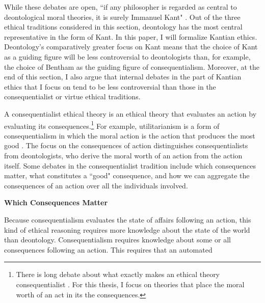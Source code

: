 \begin{isabellebody}
\begin{isamarkuptext}
While these debates are open, ``if any philosopher is regarded as central
to deontological moral theories, it is surely Immanuel Kant" \citep{sepdeont}. Out of the three ethical
traditions considered in this section, deontology has the most central representative in the form of 
Kant. In this paper, I will 
formalize Kantian ethics. Deontology's comparatively greater focus on Kant means that the choice of 
Kant as a guiding figure will be less controversial to deontologists than, for example, the choice of Bentham
as the guiding figure of consequentialism. Moreover, at the end of this section, I also argue that 
internal debates in the part of Kantian ethics that I focus on tend to be less controversial than those
in the consequentialist or virtue ethical traditions.%
\end{isamarkuptext}\isamarkuptrue%
%
\isadelimdocument
%
\endisadelimdocument
%
\isatagdocument
%
\isamarkuptrue%
%
\endisatagdocument
{\isafolddocument}%
%
\isadelimdocument
%
\endisadelimdocument
%
\begin{isamarkuptext}%
A consequentialist ethical theory is an ethical theory that evaluates an 
action by evaluating its consequences.\footnote{There is long debate about what exactly makes an ethical theory consequentialist \citep{consequentialismsep}. 
For this thesis, I focus on theories that place the moral worth of an act in its the consequences.} For example, 
utilitarianism is a form of consequentialism in which the moral action 
is the action that produces the most good \citep{utilsep}. The focus
on the consequences of action distinguishes consequentialists from deontologists, who derive the moral worth
of an action from the action itself. Some debates in the consequentialist tradition include 
which consequences matter, what constitutes a ``good" consequence, and how we can 
aggregate the consequences of an action over all the individuals involved.%
\end{isamarkuptext}\isamarkuptrue%
%
\begin{isamarkuptext}%
\noindent \textbf{Which Consequences Matter}%
\end{isamarkuptext}\isamarkuptrue%
%
\begin{isamarkuptext}%
Because consequentialism evaluates the state of affairs following an action, this kind of ethical 
reasoning requires more knowledge about the state of the world than deontology. Consequentialism
requires knowledge about some or all consequences following an action. This requires that an automated 

\end{isamarkuptext}
\end{isabellebody}

